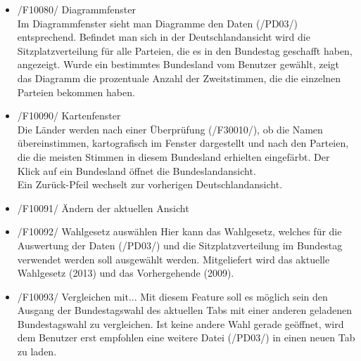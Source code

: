 \documentclass[10pt,a4paper]{article}
\begin{document}
\begin{itemize}
	\item /F10080/ Diagrammfenster \hfill \\
	Im Diagrammfenster sieht man Diagramme den Daten (/PD03/) entsprechend. Befindet man sich in der Deutschlandansicht wird die Sitzplatzverteilung für alle Parteien, die es in den Bundestag geschafft haben, angezeigt. Wurde ein bestimmtes Bundesland vom Benutzer gewählt, zeigt das Diagramm die prozentuale Anzahl der Zweitstimmen, die die einzelnen Parteien bekommen haben.
	
	\item /F10090/ Kartenfenster \hfill \\
	Die Länder werden nach einer Überprüfung (/F30010/), ob die Namen übereinstimmen, kartografisch im Fenster dargestellt und nach den Parteien, die die meisten Stimmen in diesem Bundesland erhielten eingefärbt. Der Klick auf ein Bundesland öffnet die Bundeslandansicht. \\
	Ein Zurück-Pfeil wechselt zur vorherigen Deutschlandansicht.
	
	\item /F10091/ Ändern der aktuellen Ansicht
	
	\item /F10092/ Wahlgesetz auswählen
	Hier kann das Wahlgesetz, welches für die Auswertung der Daten (/PD03/) und die Sitzplatzverteilung im Bundestag verwendet werden soll ausgewählt werden. Mitgeliefert wird das aktuelle Wahlgesetz (2013) und das Vorhergehende (2009).
	
	\item /F10093/ Vergleichen mit...
	Mit diesem Feature soll es möglich sein den Ausgang der Bundestagswahl des aktuellen Tabs mit einer anderen geladenen Bundestagswahl zu vergleichen. Ist keine andere Wahl gerade geöffnet, wird dem Benutzer erst empfohlen eine weitere Datei (/PD03/) in einen neuen Tab zu laden.
\end{itemize}
\end{document}
